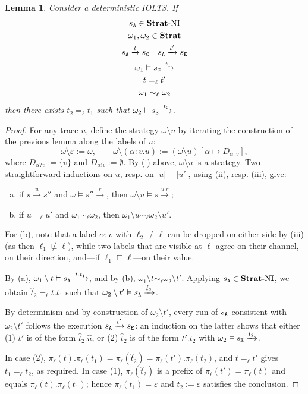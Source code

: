 \documentclass[preprint,5p,twocolumn]{elsarticle}
\newtheorem{lemma}[theorem]{Lemma}
\begin{document}
\begin{lemma}
  \label{thm:indistinguishable NI}
  Consider a deterministic IOLTS. If
    \begin{gather*}
    s_{\mathtt{A}} \in \mathbf{Strat}\text{-}\mathrm{NI}\\
    \omega_1,\omega_2 \in \mathbf{Strat}\\
    s_{\mathtt{A}} \xrightarrow{t} s_{\mathtt{C}} \quad
    s_{\mathtt{A}} \xrightarrow{t'} s_{\mathtt{E}}\\
    \omega_1 \vDash s_{\mathtt{C}} \xrightarrow{t_1} \\
    t =_\ell t'\\
    \omega_1 \sim_\ell \omega_2
  \end{gather*}
  then there exists $t_2 =_\ell t_1$ such that $\omega_2 \vDash s_{\mathtt{E}} \xrightarrow{t_2}$.
\end{lemma}
\begin{proof}
  For any trace $u$, define the strategy $\omega \setminus u$ by iterating the construction of the
  previous lemma along the labels of $u$:
  $$\omega \setminus \varepsilon := \omega, \qquad
  \omega \setminus (\alpha : v.u) := (\omega \setminus u)[\alpha \mapsto D_{\alpha:v}],$$
  where $D_{\alpha ? v} := \{v\}$ and $D_{\alpha ! v} := \emptyset$. By (i) above, $\omega\setminus u$
  is a strategy. Two straightforward inductions on $u$, resp. on $|u| + |u'|$, using (ii), resp. (iii),
  give:
  \begin{enumerate}[(a)]
  \item if $s \xrightarrow{u} s''$ and $\omega \vDash s'' \xrightarrow{r}$, then
    $\omega \setminus u \vDash s \xrightarrow{u.r}$;
  \item if $u =_\ell u'$ and $\omega_1 \sim_\ell \omega_2$, then
    $\omega_1 \setminus u \sim_\ell \omega_2 \setminus u'$.
  \end{enumerate}
  For (b), note that a label $\alpha : v$ with $\ell_2 \not\sqsubseteq \ell$ can be dropped on either
  side by (iii) (as then $\ell_1 \not \sqsubseteq \ell$), while two labels that are visible at $\ell$
  agree on their channel, on their direction, and---if $\ell_1 \sqsubseteq \ell$---on their value.

  By (a), $\omega_1 \setminus t \vDash s_{\mathtt{A}} \xrightarrow{t.t_1}$, and by (b),
  $\omega_1 \setminus t \sim_\ell \omega_2 \setminus t'$. Applying $s_{\mathtt{A}} \in \mathbf{Strat}\text{-}\mathrm{NI}$, we obtain
  $\hat{t}_2 =_\ell t.t_1$ such that $\omega_2 \setminus t' \vDash s_{\mathtt{A}} \xrightarrow{\hat{t}_2}$.

  By determinism and by construction of $\omega_2 \setminus t'$, every run of $s_{\mathtt{A}}$ consistent with
  $\omega_2 \setminus t'$ follows the execution $s_{\mathtt{A}} \xrightarrow{t'} s_{\mathtt{E}}$: an induction on the latter
  shows that either (1) $t'$ is of the form $\hat{t}_2.\hat{u}$, or (2) $\hat{t}_2$ is of the form
  $t'.t_2$ with $\omega_2 \vDash s_{\mathtt{E}} \xrightarrow{t_2}$.

  In case (2), $\pi_\ell(t).\pi_\ell(t_1) = \pi_\ell(\hat{t}_2) = \pi_\ell(t').\pi_\ell(t_2)$, and
  $t =_\ell t'$ gives $t_1 =_\ell t_2$, as required. In case (1), $\pi_\ell(\hat{t}_2)$ is a prefix of
  $\pi_\ell(t') = \pi_\ell(t)$ and equals $\pi_\ell(t).\pi_\ell(t_1)$; hence
  $\pi_\ell(t_1) = \varepsilon$ and $t_2 := \varepsilon$ satisfies the conclusion.
\end{proof}
\end{document}
